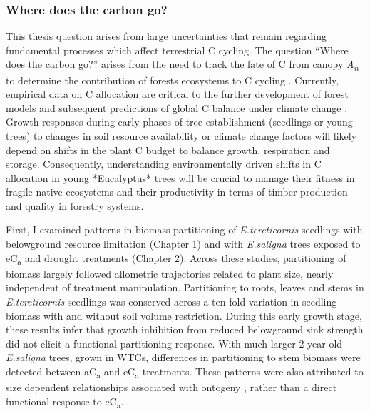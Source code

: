 \documentclass[a4paper]{article}\usepackage[]{graphicx}\usepackage[]{color}
\begin{document}
\subsubsection*{Where does the carbon go?}
This thesis question arises from large uncertainties that remain regarding fundamental processes which affect terrestrial C cycling.  The question \enquote{Where does the carbon go?} arises from the need to track the fate of C from canopy \textit{A\textsubscript{n}} to determine the contribution of forests ecosystems to C cycling \citep{litton2007carbon}. Currently, empirical data on C allocation are critical to the further development of forest models and subsequent predictions of global C balance under climate change \citep{franklin2012modeling}. Growth responses during early phases of tree establishment (seedlings or young trees) to changes in soil resource availability or climate change factors will likely depend on shifts in the plant C budget to balance growth, respiration and storage. Consequently, understanding environmentally driven shifts in C allocation in young *Eucalyptus* trees will be crucial to manage their fitness in fragile native ecosystems and their productivity in terms of timber production and quality in forestry systems.

First, I examined patterns in biomass partitioning of \textit{E.tereticornis} seedlings with belowground resource limitation (Chapter 1) and with \textit{E.saligna} trees exposed to eC\textsubscript{a} and drought treatments (Chapter 2). Across these studies, partitioning of biomass largely followed allometric trajectories related to plant size, nearly independent of treatment manipulation. Partitioning to roots, leaves and stems in \textit{E.tereticornis} seedlings was conserved across a ten-fold variation in seedling biomass with and without soil volume restriction. During this early growth stage, these results infer that growth inhibition from reduced belowground sink strength did not elicit a functional partitioning response. With much larger 2 year old \textit{E.saligna} trees, grown in WTCs, differences in partitioning to stem biomass were detected between aC\textsubscript{a} and eC\textsubscript{a} treatments. These patterns were also attributed to size dependent relationships associated with ontogeny \citep[see]{poorter2015does}, rather than a direct functional response to eC\textsubscript{a}.
\end{document}
